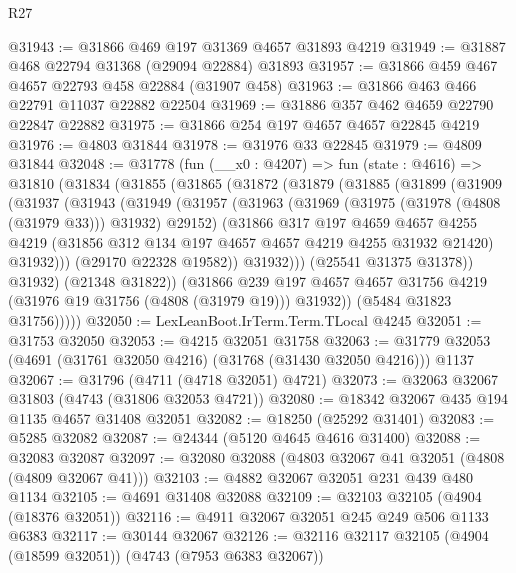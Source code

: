 \begin{lexlean}{R27}
\begin{coremodule}
@31943 := @31866 @469 @197 @31369 @4657 @31893 @4219
@31949 := @31887 @468 @22794 @31368 (@29094 @22884) @31893
@31957 := @31866 @459 @467 @4657 @22793 @458 @22884 (@31907 @458)
@31963 := @31866 @463 @466 @22791 @11037 @22882 @22504
@31969 := @31886 @357 @462 @4659 @22790 @22847 @22882
@31975 := @31866 @254 @197 @4657 @4657 @22845 @4219
@31976 := @4803 @31844
@31978 := @31976 @33 @22845
@31979 := @4809 @31844
@32048 := @31778
    (fun (__x0 : @4207) =>
    fun (state : @4616) =>
    @31810
      (@31834
        (@31855
          (@31865
            (@31872
              (@31879
                (@31885
                  (@31899
                    (@31909
                      (@31937
                        (@31943
                          (@31949
                            (@31957
                              (@31963
                                (@31969 (@31975 (@31978 (@4808 (@31979 @33))) @31932) @29152)
                                (@31866
                                  @317
                                  @197
                                  @4659
                                  @4657
                                  @4255
                                  @4219
                                  (@31856 @312 @134 @197 @4657 @4657 @4219 @4255 @31932 @21420)
                                  @31932)))
                            (@29170 @22328 @19582))
                          @31932)))
                    (@25541 @31375 @31378))
                  @31932)
                (@21348 @31822))
              (@31866
                @239
                @197
                @4657
                @4657
                @31756
                @4219
                (@31976 @19 @31756 (@4808 (@31979 @19)))
                @31932))
            (@5484 @31823 @31756)))))
@32050 := LexLeanBoot.IrTerm.Term.TLocal @4245
@32051 := @31753 @32050
@32053 := @4215 @32051 @31758
@32063 := @31779 @32053 (@4691 (@31761 @32050 @4216) (@31768 (@31430 @32050 @4216))) @1137
@32067 := @31796 (@4711 (@4718 @32051) @4721)
@32073 := @32063 @32067 @31803 (@4743 (@31806 @32053 @4721))
@32080 := @18342 @32067 @435 @194 @1135 @4657 @31408 @32051
@32082 := @18250 (@25292 @31401)
@32083 := @5285 @32082
@32087 := @24344 (@5120 @4645 @4616 @31400)
@32088 := @32083 @32087
@32097 := @32080 @32088 (@4803 @32067 @41 @32051 (@4808 (@4809 @32067 @41)))
@32103 := @4882 @32067 @32051 @231 @439 @480 @1134
@32105 := @4691 @31408 @32088
@32109 := @32103 @32105 (@4904 (@18376 @32051))
@32116 := @4911 @32067 @32051 @245 @249 @506 @1133 @6383
@32117 := @30144 @32067
@32126 := @32116 @32117 @32105 (@4904 (@18599 @32051)) (@4743 (@7953 @6383 @32067))

\end{coremodule}
\end{lexlean}
